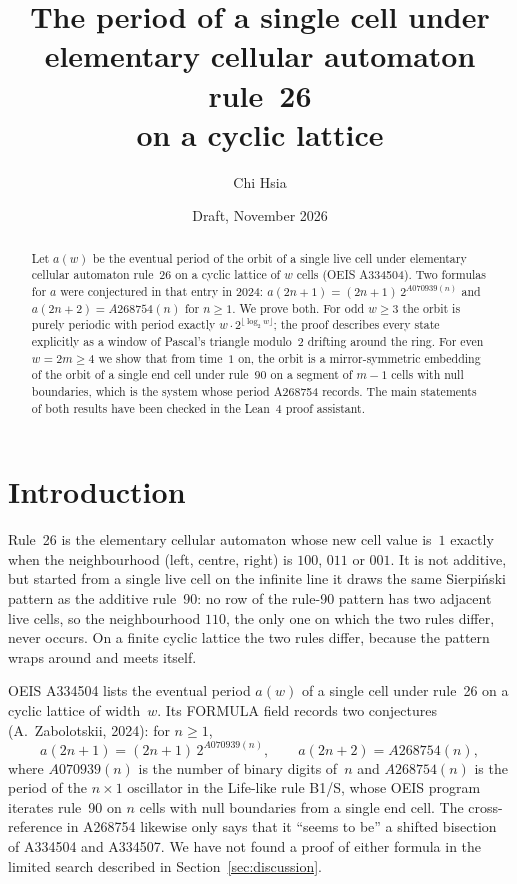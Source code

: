 \documentclass[11pt]{article}
\title{The period of a single cell under elementary cellular automaton rule~26\\ on a cyclic lattice}
\author{Chi Hsia}
\date{Draft, November 2026}
\theoremstyle{definition}
\theoremstyle{remark}
\begin{document}
\maketitle

\begin{abstract}
Let $a(w)$ be the eventual period of the orbit of a single live cell under
elementary cellular automaton rule~26 on a cyclic lattice of $w$ cells
(OEIS A334504). Two formulas for $a$ were conjectured in that entry in 2024:
$a(2n+1) = (2n+1)\,2^{A070939(n)}$ and $a(2n+2) = A268754(n)$ for $n \ge 1$.
We prove both. For odd $w \ge 3$ the orbit is purely periodic with period
exactly $w \cdot 2^{\lfloor \log_2 w \rfloor}$; the proof describes every state
explicitly as a window of Pascal's triangle modulo~$2$ drifting around the
ring. For even $w = 2m \ge 4$ we show that from time~$1$ on, the orbit is a
mirror-symmetric embedding of the orbit of a single end cell under rule~90 on
a segment of $m-1$ cells with null boundaries, which is the system whose
period A268754 records. The main statements of both results have been
checked in the Lean~4 proof assistant.
\end{abstract}

\section{Introduction}

Rule~26 is the elementary cellular automaton whose new cell value is~$1$
exactly when the neighbourhood (left, centre, right) is $100$, $011$ or $001$.
It is not additive, but started from a single live cell on the infinite line
it draws the same Sierpi\'nski pattern as the additive rule~90: no row of the
rule-90 pattern has two adjacent live cells, so the neighbourhood $110$, the
only one on which the two rules differ, never occurs. On a finite
cyclic lattice the two rules differ, because the pattern wraps around and
meets itself.

OEIS A334504 lists the eventual period $a(w)$ of a single cell under rule~26
on a cyclic lattice of width~$w$. Its FORMULA field records two conjectures
(A.~Zabolotskii, 2024): for $n \ge 1$,
\begin{equation}\label{eq:conj}
a(2n+1) = (2n+1)\,2^{A070939(n)}, \qquad a(2n+2) = A268754(n),
\end{equation}
where $A070939(n)$ is the number of binary digits of~$n$ and $A268754(n)$ is
the period of the $n \times 1$ oscillator in the Life-like rule B1/S, whose
OEIS program iterates rule~90 on $n$ cells with null boundaries from a single
end cell. The cross-reference in A268754 likewise only says that it
``seems to be'' a shifted bisection of A334504 and A334507. We have not found
a proof of either formula in the limited search described in
Section~\ref{sec:discussion}.
\end{document}
